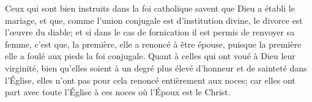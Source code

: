 Ceux qui sont bien instruits dans la foi catholique
		savent que Dieu a établi le mariage,
	et que, comme l’union conjugale est d’institution divine,
	le divorce est l’œuvre du diable;
	et si dans le cas de fornication il est permis de renvoyer sa femme,
	c’est que, la première, elle a renoncé à être épouse,
	puisque la première elle a foulé aux pieds la foi conjugale.
Quant à celles qui ont voué à Dieu leur virginité,
	bien qu’elles soient à un degré plus élevé d’honneur et de sainteté dans l’Église,
	elles n’ont pas pour cela renoncé entièrement aux noces;
	car elles ont part avec toute l’Église à ces noces où l’Époux est le Christ.

